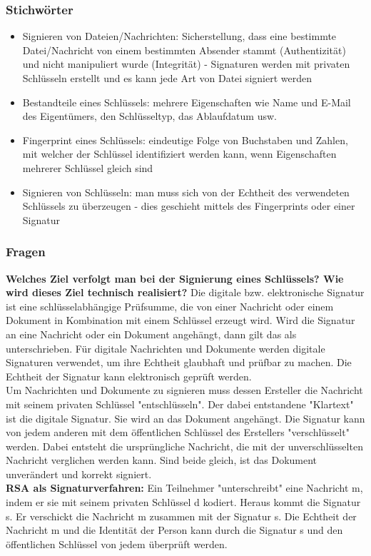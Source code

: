 \documentclass[12pt,a4paper]{article}
\begin{document}
\subsubsection{Stichwörter}
\begin{itemize}
    \item Signieren von Dateien/Nachrichten: Sicherstellung, dass eine bestimmte Datei/Nachricht von einem bestimmten Absender stammt (Authentizität) und nicht manipuliert wurde (Integrität) - Signaturen werden mit privaten Schlüsseln erstellt und es kann jede Art von Datei signiert werden
    \item Bestandteile eines Schlüssels: mehrere Eigenschaften wie Name und E-Mail des Eigentümers, den Schlüsseltyp, das Ablaufdatum usw.
    \item Fingerprint eines Schlüssels: eindeutige Folge von Buchstaben und Zahlen, mit welcher der Schlüssel identifiziert werden kann, wenn Eigenschaften mehrerer Schlüssel gleich sind 
    \item Signieren von Schlüsseln: man muss sich von der Echtheit des verwendeten Schlüssels zu überzeugen - dies geschieht mittels des Fingerprints oder einer Signatur
\end{itemize}
\subsubsection{Fragen}
\textbf{Welches Ziel verfolgt man bei der Signierung eines Schlüssels? Wie wird dieses Ziel technisch realisiert?} Die digitale bzw. elektronische Signatur ist eine schlüsselabhängige Prüfsumme, die von einer Nachricht oder einem Dokument in Kombination mit einem Schlüssel erzeugt wird. Wird die Signatur an eine Nachricht oder ein Dokument angehängt, dann gilt das als unterschrieben. Für digitale Nachrichten und Dokumente werden digitale Signaturen verwendet, um ihre Echtheit glaubhaft und prüfbar zu machen. Die Echtheit der Signatur kann elektronisch geprüft werden.\\
Um Nachrichten und Dokumente zu signieren muss dessen Ersteller die Nachricht mit seinem privaten Schlüssel "entschlüsseln". Der dabei entstandene "Klartext" ist die digitale Signatur. Sie wird an das Dokument angehängt. Die Signatur kann von jedem anderen mit dem öffentlichen Schlüssel des Erstellers "verschlüsselt" werden. Dabei entsteht die ursprüngliche Nachricht, die mit der unverschlüsselten Nachricht verglichen werden kann. Sind beide gleich, ist das Dokument unverändert und korrekt signiert.\\
\textbf{RSA als Signaturverfahren:}
Ein Teilnehmer "unterschreibt" eine Nachricht m, indem er sie mit seinem privaten Schlüssel d kodiert. Heraus kommt die Signatur s.
Er verschickt die Nachricht m zusammen mit der Signatur s.
Die Echtheit der Nachricht m und die Identität der Person kann durch die Signatur s und den öffentlichen Schlüssel von jedem überprüft werden.\\
\end{document}
